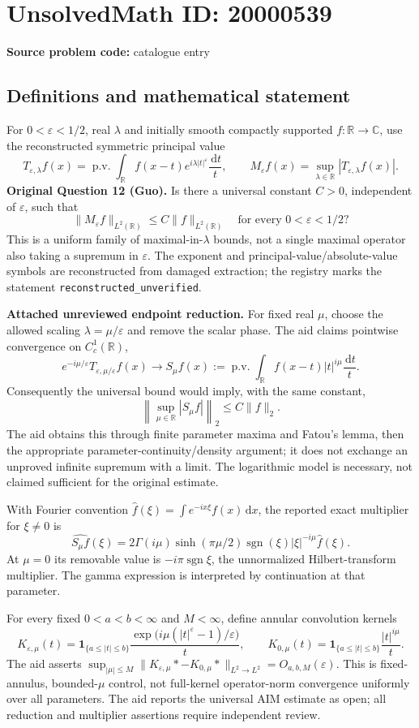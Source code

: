 \documentclass[11pt]{article}
\newcommand{\R}{\mathbb{R}}
\newcommand{\C}{\mathbb{C}}
\newcommand{\eps}{\varepsilon}
\newcommand{\dd}{\,\mathrm{d}}
\begin{document}
\section*{UnsolvedMath ID: 20000539}
\textbf{Source problem code:} catalogue entry
\subsection{Definitions and mathematical statement}
For $0<\eps<1/2$, real $\lambda$ and initially smooth compactly supported $f:\R\to\C$, use the reconstructed symmetric principal value
\[T_{\eps,\lambda}f(x)=\operatorname{p.v.}\int_\R f(x-t)e^{i\lambda|t|^\eps}\frac{\dd t}{t},\qquad M_\eps f(x)=\sup_{\lambda\in\R}|T_{\eps,\lambda}f(x)|.\]
\textbf{Original Question 12 (Guo).} Is there a universal constant $C>0$, independent of $\eps$, such that
\[\|M_\eps f\|_{L^2(\R)}\le C\|f\|_{L^2(\R)}\quad\text{for every }0<\eps<1/2?\]
This is a uniform family of maximal-in-$\lambda$ bounds, not a single maximal operator also taking a supremum in $\eps$. The exponent and principal-value/absolute-value symbols are reconstructed from damaged extraction; the registry marks the statement \texttt{reconstructed\_unverified}.

\textbf{Attached unreviewed endpoint reduction.} For fixed real $\mu$, choose the allowed scaling $\lambda=\mu/\eps$ and remove the scalar phase. The aid claims pointwise convergence on $C_c^1(\R)$,
\[e^{-i\mu/\eps}T_{\eps,\mu/\eps}f(x)\longrightarrow S_\mu f(x):=\operatorname{p.v.}\int_\R f(x-t)|t|^{i\mu}\frac{\dd t}{t}.\]
Consequently the universal bound would imply, with the same constant,
\[\left\|\sup_{\mu\in\R}|S_\mu f|\right\|_2\le C\|f\|_2.\]
The aid obtains this through finite parameter maxima and Fatou's lemma, then the appropriate parameter-continuity/density argument; it does not exchange an unproved infinite supremum with a limit. The logarithmic model is necessary, not claimed sufficient for the original estimate.

With Fourier convention $\widehat f(\xi)=\int e^{-ix\xi}f(x)\dd x$, the reported exact multiplier for $\xi\ne0$ is
\[\widehat{S_\mu f}(\xi)=2\Gamma(i\mu)\sinh(\pi\mu/2)\operatorname{sgn}(\xi)|\xi|^{-i\mu}\widehat f(\xi).\]
At $\mu=0$ its removable value is $-i\pi\operatorname{sgn}\xi$, the unnormalized Hilbert-transform multiplier. The gamma expression is interpreted by continuation at that parameter.

For every fixed $0<a<b<\infty$ and $M<\infty$, define annular convolution kernels
\[K_{\eps,\mu}(t)=\mathbf1_{\{a\le|t|\le b\}}\frac{\exp\bigl(i\mu(|t|^\eps-1)/\eps\bigr)}t,\qquad K_{0,\mu}(t)=\mathbf1_{\{a\le|t|\le b\}}\frac{|t|^{i\mu}}t.\]
The aid asserts $\sup_{|\mu|\le M}\|K_{\eps,\mu}*-K_{0,\mu}*\|_{L^2\to L^2}=O_{a,b,M}(\eps)$. This is fixed-annulus, bounded-$\mu$ control, not full-kernel operator-norm convergence uniformly over all parameters. The aid reports the universal AIM estimate as open; all reduction and multiplier assertions require independent review.
\end{document}
